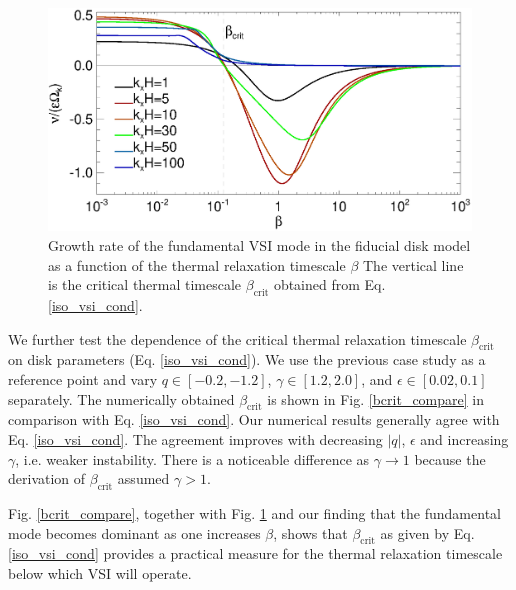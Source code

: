 \begin{figure}
   \includegraphics[width=\linewidth]{figures/gcorr_compare2} 
   \caption{Growth rate of the fundamental VSI mode in the fiducial disk
     model as a function of the thermal relaxation timescale $\beta$
     The vertical line is the critical thermal timescale
     $\beta_\mathrm{crit}$ obtained 
     from Eq. \ref{iso_vsi_cond}. 
     \label{bcrit_compare1}}   
 \end{figure} 
 
 We further test the dependence of the critical thermal relaxation timescale 
 $\beta_\mathrm{crit}$ on disk parameters
 (Eq. \ref{iso_vsi_cond}).  We use the previous case study as a
 reference point and vary $q\in[-0.2,-1.2]$, 
 $\gamma\in[1.2,2.0]$, and $\epsilon\in[0.02,0.1]$
 separately.
 The numerically obtained $\beta_\mathrm{crit}$ is shown in
 Fig. \ref{bcrit_compare} in comparison with Eq. \ref{iso_vsi_cond}.
 Our numerical results generally agree with Eq. \ref{iso_vsi_cond}. The
 agreement improves with decreasing  $|q|$,  $\epsilon$ and increasing
 $\gamma$, i.e. weaker instability. There is a noticeable difference
 as $\gamma\to1$ because the derivation of $\beta_\mathrm{crit}$
 assumed $\gamma>1$.   
 
 Fig. \ref{bcrit_compare}, together with Fig. \ref{bcrit_compare1} and 
 our finding that the fundamental mode becomes dominant as one
 increases $\beta$, shows that $\beta_\mathrm{crit}$ as given 
 by Eq. \ref{iso_vsi_cond} provides a  
 practical measure for the thermal relaxation timescale below which 
 VSI will operate. 



